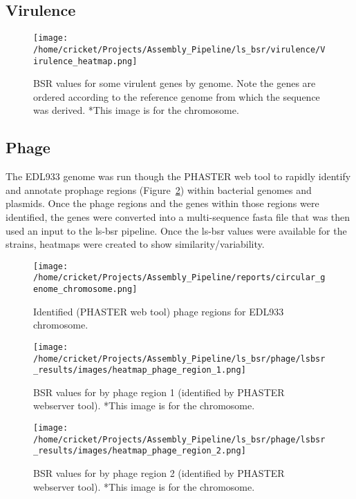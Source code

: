 \documentclass[11pt]{article}
\begin{document}
\subsection*{Virulence}
\begin{figure}[ht!]\normalsize %
\centering
\texttt{[image: /home/cricket/Projects/Assembly\_Pipeline/ls\_bsr/virulence/Virulence\_heatmap.png]}
\caption{BSR values for some virulent genes by genome. Note the genes are ordered according to the reference genome from which the sequence was derived. *This image is for the chromosome.}
\label{VirrulenceHeatMap}
\end{figure}

\subsection*{Phage}
The EDL933 genome was run though the PHASTER web tool to rapidly identify and annotate prophage regions (Figure~\ref{phage_regions}) within bacterial genomes and plasmids. Once the phage regions and the genes within those regions were identified, the genes were converted into a multi-sequence fasta file that was then used an input to the ls-bsr pipeline. Once the ls-bsr values were available for the strains, heatmaps were created to show similarity/variability. 

\begin{figure}[ht!]\normalsize %
\centering
\texttt{[image: /home/cricket/Projects/Assembly\_Pipeline/reports/circular\_genome\_chromosome.png]}
\caption{Identified (PHASTER web  tool) phage regions for EDL933 chromosome.}
\label{phage_regions}
\end{figure}

\begin{figure}[ht!]\normalsize %
\centering
\texttt{[image: /home/cricket/Projects/Assembly\_Pipeline/ls\_bsr/phage/lsbsr\_results/images/heatmap\_phage\_region\_1.png]} 
\caption{BSR values for by phage region 1 (identified by PHASTER webserver tool). *This image is for the chromosome.}
\label{phage_1}
\end{figure}

\clearpage

\begin{figure}[ht!]\normalsize %
\centering
\texttt{[image: /home/cricket/Projects/Assembly\_Pipeline/ls\_bsr/phage/lsbsr\_results/images/heatmap\_phage\_region\_2.png]} 
\caption{BSR values for by phage region 2 (identified by PHASTER webserver tool). *This image is for the chromosome.}
\label{phage_2}
\end{figure}
\end{document}

